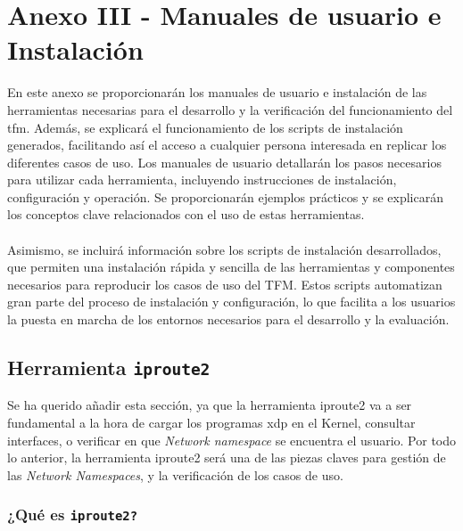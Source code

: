 \chapter{Anexo III - Manuales de usuario e Instalación}


En este anexo se proporcionarán los manuales de usuario e instalación de las herramientas necesarias para el desarrollo y la verificación del funcionamiento del \gls{tfm}. Además, se explicará el funcionamiento de los scripts de instalación generados, facilitando así el acceso a cualquier persona interesada en replicar los diferentes casos de uso. Los manuales de usuario detallarán los pasos necesarios para utilizar cada herramienta, incluyendo instrucciones de instalación, configuración y operación. Se proporcionarán ejemplos prácticos y se explicarán los conceptos clave relacionados con el uso de estas herramientas.\\
\\
Asimismo, se incluirá información sobre los scripts de instalación desarrollados, que permiten una instalación rápida y sencilla de las herramientas y componentes necesarios para reproducir los casos de uso del TFM. Estos scripts automatizan gran parte del proceso de instalación y configuración, lo que facilita a los usuarios la puesta en marcha de los entornos necesarios para el desarrollo y la evaluación.

\section{Herramienta \texttt{iproute2}}
\label{iproute2}
Se ha querido añadir esta sección, ya que la herramienta iproute2 va a ser fundamental a la hora de cargar los programas \gls{xdp} en el Kernel, consultar interfaces, o verificar en que \textit{Network namespace} se encuentra el usuario. Por todo lo anterior, la herramienta iproute2 será una de las piezas claves para gestión de las \textit{Network Namespaces}, y la verificación de los casos de uso.



\subsection{¿Qué es \texttt{iproute2?}}

